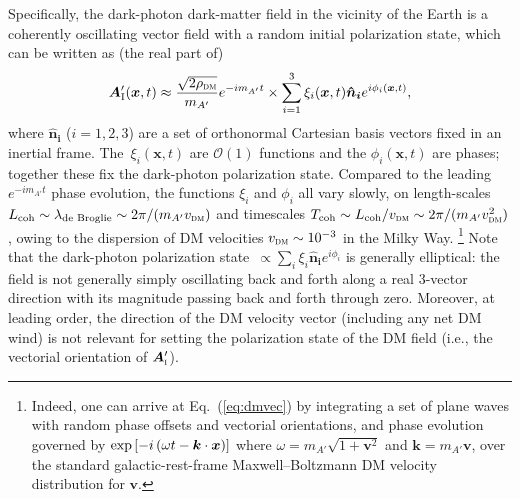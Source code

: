 \documentclass[amsmath,amssymb,aps,10pt,prd,letterpaper,nofootinbib,balancelastpage,notitlepage,superscriptaddress,twocolumn,floatfix]{revtex4-2}
\renewcommand{\eqref}[2][]{Eq{#1}.~(\ref{eq:#2})}	%
\newcommand{\lb}{\ensuremath{\left}}					%
\newcommand{\rb}{\ensuremath{\right}}					%
\begin{document}
Specifically, the dark-photon dark-matter field in the vicinity of the Earth is a coherently oscillating vector field with a random initial polarization state, which can be written as (the real part of)
\begin{align}
    \bm{A}'_\textsc{I}(\bm{x},t) \approx \frac{\sqrt{2\rho_{\textsc{dm}}}}{m_{A'}} e^{-im_{A'}t} \times\sum_{i=1}^3  \xi_i(\bm{x},t) \bm{\hat{n}_i} e^{i\phi_i(\bm{x},t)},
    \label{eq:dmvec}
\end{align}
where $\bm{\hat{n}_i}$ ($i=1,2,3$) are a set of orthonormal Cartesian basis vectors fixed in an inertial frame.
The~$\xi_i(\bm{x},t)$ are $\mathcal{O}(1)$ functions and the $\phi_i(\bm{x},t)$ are phases; together these fix the dark-photon polarization state.
Compared to the leading $e^{-im_{A'}t}$ phase evolution, the functions $\xi_i$ and $\phi_i$ all vary slowly, on length-scales $L_{\text{coh}} \sim \lambda_{\text{de Broglie}} \sim 2\pi/(m_{A'}v_{\textsc{dm}})$ and timescales $T_{\text{coh}}\sim L_{\text{coh}}/v_{\textsc{dm}} \sim 2\pi/(m_{A'}v_{\textsc{dm}}^2)$, owing to the dispersion of DM velocities $v_{\textsc{dm}}\sim 10^{-3}$ in the Milky Way.%
\footnote{\label{ftnt:coherence}%
    Indeed, one can arrive at \eqref{dmvec} by integrating a set of plane waves with random phase offsets and vectorial orientations, and phase evolution governed by $\exp\lb[ -i \lb( \omega t - \bm{k}\cdot\bm{x} \rb) \rb]$ where $\omega = m_{A'} \sqrt{ 1  + \bm{v}^2 }$ and $\bm{k} = m_{A'}\bm{v}$, over the standard galactic-rest-frame Maxwell--Boltzmann DM velocity distribution for $\bm{v}$.
} %
Note that the dark-photon polarization state~$\propto \sum_i \xi_i \bm{\hat{n}_i}e^{i\phi_i}$ is generally elliptical: the field is not generally simply oscillating back and forth along a real 3-vector direction with its magnitude passing back and forth through zero.
Moreover, at leading order, the direction of the DM velocity vector (including any net DM wind) is not relevant for setting the polarization state of the DM field (i.e., the vectorial orientation of $\bm{A}_{\textsc{i}}'$).
\end{document}
